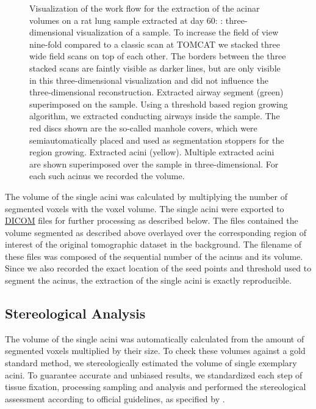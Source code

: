 \documentclass[twoside,paper=a4,abstract=true,english,DIVcalc]{scrartcl}
\newlength\imagescale		%
\begin{document}
\begin{figure}
{%
		\label{subfig:extracted acini}%
		}
	\caption{Visualization of the work flow for the extraction of the acinar volumes on a rat lung sample extracted at day 60: %
		\protect{}: three-dimensional visualization of a sample. To increase the field of view nine-fold compared to a classic scan at TOMCAT we stacked three wide field scans on top of each other. The borders between the three stacked scans are faintly visible as darker lines, but are only visible in this three-dimensional visualization and did not influence the three-dimensional reconstruction. %
		\protect{} Extracted airway segment (green) superimposed on the sample. Using a threshold based region growing algorithm, we extracted conducting airways inside the sample. The red discs shown are the so-called manhole covers, which were semiautomatically placed and used as segmentation stoppers for the region growing. %
		\protect{} Extracted acini (yellow). Multiple extracted acini are shown superimposed over the sample in three-dimensional. For each such acinus we recorded the volume.%
		}
	\label{fig:workflow}
\end{figure}

The volume of the single acini was calculated by multiplying the number of segmented voxels with the voxel volume. The single acini were exported to \href{https://secure.wikimedia.org/wikipedia/en/w/index.php?title=Digital_Imaging_and_Communications_in_Medicine&oldid=415023605}{DICOM} files for further processing as described below. The files contained the volume segmented as described above overlayed over the corresponding region of interest of the original tomographic dataset in the background. The filename of these files was composed of the sequential number of the acinus and its volume. Since we also recorded the exact location of the seed points and threshold used to segment the acinus, the extraction of the single acini is exactly reproducible.

\subsection{Stereological Analysis}
The volume of the single acini was automatically calculated from the amount of segmented voxels multiplied by their size. To check these volumes against a gold standard method, we stereologically estimated the volume of single exemplary acini. To guarantee accurate and unbiased results, we standardized each step of tissue fixation, processing sampling and analysis and performed the stereological assessment according to official guidelines, as specified by \citet{Hsia2010}.
\end{document}
